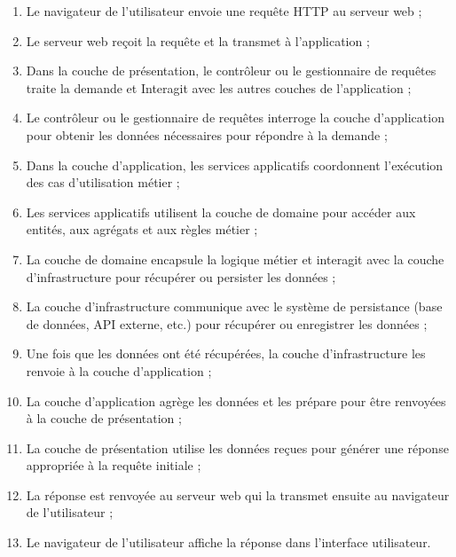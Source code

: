 \begin{enumerate}
    \item Le navigateur de l'utilisateur envoie une requête HTTP au serveur web ;

    \item Le serveur web reçoit la requête et la transmet à l'application ;

    \item Dans la couche de présentation, le contrôleur ou le gestionnaire de requêtes traite la demande et Interagit avec les autres couches de l'application ;

    \item Le contrôleur ou le gestionnaire de requêtes interroge la couche d'application pour obtenir les données nécessaires pour répondre à la demande ;
    \item Dans la couche d'application, les services applicatifs coordonnent l'exécution des cas d'utilisation métier ;

    \item Les services applicatifs utilisent la couche de domaine pour accéder aux entités, aux agrégats et aux règles métier ;

    \item La couche de domaine encapsule la logique métier et interagit avec la couche d'infrastructure pour récupérer ou persister les données ;

    \item La couche d'infrastructure communique avec le système de persistance (base de données, API externe, etc.) pour récupérer ou enregistrer les données ;

    \item Une fois que les données ont été récupérées, la couche d'infrastructure les renvoie à la couche d'application ;

    \item La couche d'application agrège les données et les prépare pour être renvoyées à la couche de présentation ;

    \item La couche de présentation utilise les données reçues pour générer une réponse appropriée à la requête initiale ;
    \item La réponse est renvoyée au serveur web qui la transmet ensuite au navigateur de l'utilisateur ;

    \item Le navigateur de l'utilisateur affiche la réponse dans l'interface utilisateur.
\end{enumerate}


